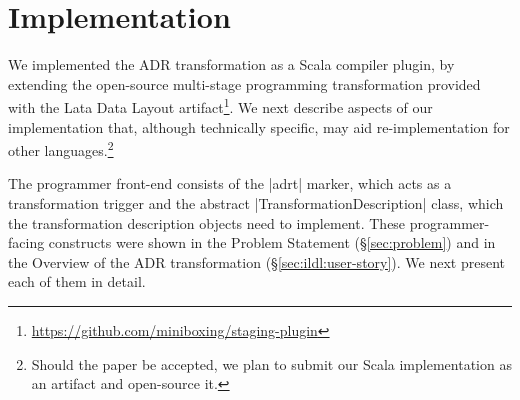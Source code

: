 \section{Implementation}
\label{sec:impl}

We implemented the ADR transformation as a Scala compiler plugin, by
extending the open-source multi-stage programming transformation
provided with the Lata Data Layout \cite{ldl}
artifact\footnote{\url{https://github.com/miniboxing/staging-plugin}}.
%
We next describe aspects of our implementation that, although
technically specific, may aid re-implementation for other
languages.\footnote{Should the paper be accepted, we plan to submit our Scala
implementation as an artifact and open-source it.}

The programmer front-end consists of the |adrt| marker, which acts as a transformation trigger and the abstract |TransformationDescription| class, which the transformation description objects need to implement. These programmer-facing constructs were shown in the Problem Statement (\S\ref{sec:problem}) and in the Overview of the ADR transformation (\S\ref{sec:ildl:user-story}). We next present each of them in detail.

